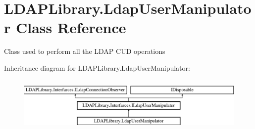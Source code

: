 \hypertarget{class_l_d_a_p_library_1_1_ldap_user_manipulator}{}\section{L\+D\+A\+P\+Library.\+Ldap\+User\+Manipulator Class Reference}
\label{class_l_d_a_p_library_1_1_ldap_user_manipulator}


Class used to perform all the L\+D\+A\+P C\+U\+D operations  


Inheritance diagram for L\+D\+A\+P\+Library.\+Ldap\+User\+Manipulator\+:\begin{figure}[H]
\begin{center}
\leavevmode
\includegraphics[height=2.692308cm]{class_l_d_a_p_library_1_1_ldap_user_manipulator}
\end{center}
\end{figure}
